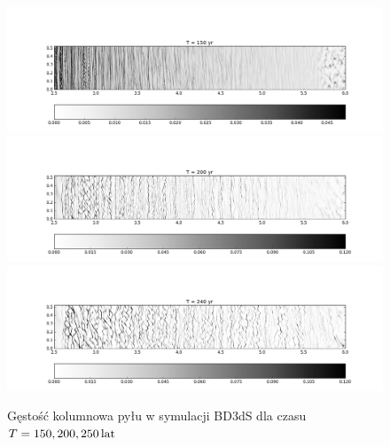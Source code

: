 \begin{figure}
   \centering
   \includegraphics[width=0.95\linewidth]{figures/proj1.png}\\
   \includegraphics[width=0.95\linewidth]{figures/proj2.png}\\
   \includegraphics[width=0.95\linewidth]{figures/proj3.png}
   \caption{Gęstość
      kolumnowa pyłu w symulacji BD3dS dla czasu $T=150, 200, 250\hbox{$\thinspace\textrm{lat}$}$}
   \label{fig:projs}
\end{figure}
%
